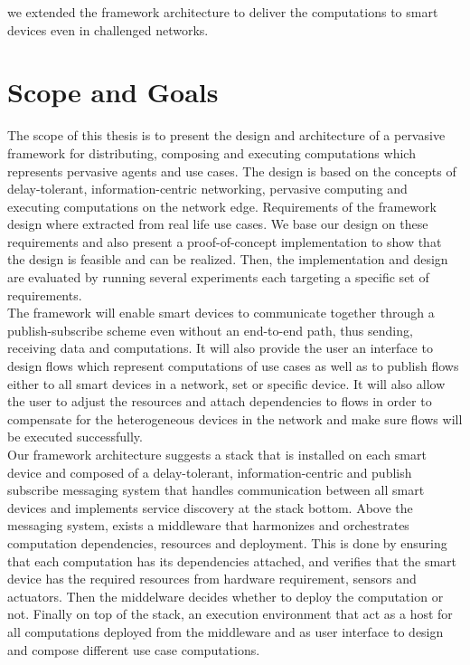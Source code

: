 we extended the framework architecture to deliver the computations to smart devices even in challenged networks. 
 
 
\section{Scope and Goals}
The scope of this thesis is to present the design and architecture of a pervasive  framework for distributing, composing and executing computations which represents pervasive agents and use cases. The design is based on the concepts of delay-tolerant, information-centric networking, pervasive computing and executing computations on the network edge. Requirements of the framework design where extracted from real life use cases. We base our design on these requirements and also present a proof-of-concept implementation to show that the design is feasible and can be realized. Then, the implementation and design are evaluated by running several experiments each targeting a specific set of requirements.\\


\noindent The framework will enable smart devices to communicate together through a publish-subscribe scheme even without an end-to-end path, thus sending, receiving data and computations.  It will also provide the user  an interface to design flows which represent computations of use cases as well as to publish flows either to all smart devices in a network, set or specific device. It will also allow the user to adjust the resources and attach dependencies to flows in order to compensate for the heterogeneous devices in the network and make sure flows will be executed successfully.\\



\noindent Our framework architecture  suggests a stack that is installed on each smart device and composed of a delay-tolerant, information-centric and publish subscribe messaging system that handles communication between all smart devices and implements service discovery at the stack bottom. Above the messaging system, exists a middleware that harmonizes and orchestrates computation dependencies, resources and deployment. This is done by ensuring that each computation has its dependencies attached, and verifies that the smart device has the required resources from hardware requirement, sensors and actuators.  Then the middelware decides whether to deploy the computation or not. Finally on top of the stack, an execution environment that act as a host for all computations deployed from the middleware and as user interface to design and compose different use case computations.

